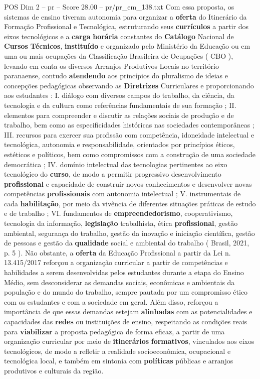 \begin{textsample}{POS Dim 2 – pr – Score 28.00 – pr/pr\_em\_138.txt}
Com essa proposta, os sistemas de ensino tiveram autonomia para organizar a \textbf{oferta} do Itinerário da Formação Profissional e Tecnológica, estruturando seus \textbf{currículos} a partir dos eixos tecnológicos e a \textbf{carga} \textbf{horária} constantes do \textbf{Catálogo} Nacional de \textbf{Cursos} \textbf{Técnicos}, \textbf{instituído} e organizado pelo Ministério da Educação ou em uma ou mais ocupações da Classificação Brasileira de Ocupações ( CBO ), levando em conta os diversos Arranjos Produtivos Locais no território paranaense, contudo \textbf{atendendo} aos princípios do pluralismo de ideias e concepções pedagógicas observando as \textbf{Diretrizes} Curriculares e proporcionando aos estudantes : I. diálogo com diversos campos do trabalho, da ciência, da tecnologia e da cultura como referências fundamentais de sua formação ; II. elementos para compreender e discutir as relações sociais de produção e de trabalho, bem como as especificidades históricas nas sociedades contemporâneas ; III. recursos para exercer sua profissão com competência, idoneidade intelectual e tecnológica, autonomia e responsabilidade, orientados por princípios éticos, estéticos e políticos, bem como compromissos com a construção de uma sociedade democrática ; IV. domínio intelectual das tecnologias pertinentes ao eixo tecnológico do \textbf{curso}, de modo a permitir progressivo desenvolvimento \textbf{profissional} e capacidade de construir novos conhecimentos e desenvolver novas competências \textbf{profissionais} com autonomia intelectual ; V. instrumentais de cada \textbf{habilitação}, por meio da vivência de diferentes situações práticas de estudo e de trabalho ; VI. fundamentos de \textbf{empreendedorismo}, cooperativismo, tecnologia da informação, \textbf{legislação} trabalhista, ética \textbf{profissional}, gestão ambiental, segurança do trabalho, gestão da inovação e iniciação científica, gestão de pessoas e gestão da \textbf{qualidade} social e ambiental do trabalho ( Brasil, 2021, p. 5 ).
Não obstante, a \textbf{oferta} da Educação Profissional a partir da Lei n. 13.415/2017 reforçou a organização curricular a partir de competências e habilidades a serem desenvolvidas pelos estudantes durante a etapa do Ensino Médio, sem desconsiderar as demandas sociais, econômicas e ambientais da população e do mundo do trabalho, sempre pautada por um compromisso ético com os estudantes e com a sociedade em geral.
Além disso, reforçou a importância de que essas demandas estejam \textbf{alinhadas} com as potencialidades e capacidades das \textbf{redes} ou instituições de ensino, respeitando as condições reais para \textbf{viabilizar} a proposta pedagógica de forma eficaz, a partir de uma organização curricular por meio de \textbf{itinerários} \textbf{formativos}, vinculados aos eixos tecnológicos, de modo a refletir a realidade socioeconômica, ocupacional e tecnológica local, e também em sintonia com \textbf{políticas} públicas e arranjos produtivos e culturais da região.

\end{textsample}
